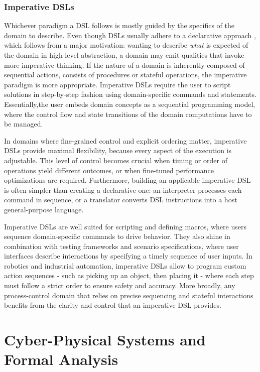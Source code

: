 \subsection{Imperative DSLs}

Whichever paradigm a DSL follows is mostly guided by the specifics of the domain to describe. Even though DSLs usually adhere to a declarative approach \cite{sigplanDSL}, which follows from a
major motivation: wanting to describe \textit{what} is expected of the domain in high-level abstraction, a domain may emit qualities that invoke more imperative thinking.
If the nature of a domain is inherently composed of sequential actions, consists of procedures or stateful operations, the imperative paradigm is more appropriate.
Imperative DSLs require the user to script solutions in step-by-step fashion using domain-specific commands and statements. Essentially,the user embeds domain concepts as a sequential programming model,
where the control flow and state transitions of the domain computations have to be managed.

In domains where fine-grained control and explicit ordering matter, imperative DSLs provide maximal flexibility, because every aspect of the execution is adjustable.
This level of control becomes crucial when timing or order of operations yield different outcomes, or when fine-tuned performance optimizations are required.
Furthermore, building an applicable imperative DSL is often simpler than creating a declarative one: an interpreter processes each command in sequence,
or a translator converts DSL instructions into a host general-purpose language.

Imperative DSLs are well suited for scripting and defining macros, where users sequence domain-specific commands to drive behavior. They also shine in combination with testing
frameworks and scenario specifications, where user interfaces describe interactions by specifying a timely sequence of user inputs. In robotics and industrial automation,
imperative DSLs allow to program custom action sequences - such as picking up an object, then placing it - where each step must follow a
strict order to ensure safety and accuracy. More broadly, any process-control domain that relies on precise sequencing and stateful interactions benefits from the clarity
and control that an imperative DSL provides.

\chapter{Cyber-Physical Systems and Formal Analysis}

